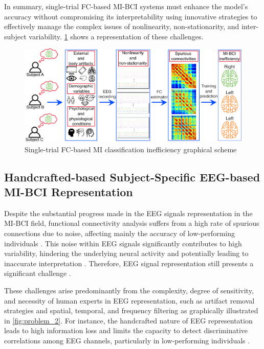In summary, single-trial FC-based MI-BCI systems must enhance the model's accuracy without compromising its interpretability using innovative strategies to effectively manage the complex issues of nonlinearity, non-stationarity, and inter-subject variability. \cref{fig:problem_1} shows a representation of these challenges.

\begin{figure}[!h]
    \centering
    \includegraphics[width=1.0\linewidth]{Figures/problem_statement/problem1_FV.pdf}
    \caption{Single-trial FC-based MI classification inefficiency graphical scheme}\label{fig:problem_1}
\end{figure}


\subsection{Handcrafted-based Subject-Specific EEG-based MI-BCI Representation \label{sec:problem2}}

Despite the substantial progress made in the EEG signals representation in the MI-BCI field, functional connectivity analysis suffers from a high rate of spurious connections due to noise, affecting mainly the accuracy of low-performing individuals \cite{ismail2020graph,wang2020diverse,congedo2017fixed}. This noise within EEG signals significantly contributes to high variability, hindering the underlying neural activity and potentially leading to inaccurate interpretation \cite{caicedo2021deep}. Therefore, EEG signal representation still presents a significant challenge \cite{rashid2020current}.

These challenges arise predominantly from the complexity, degree of sensitivity, and necessity of human experts in EEG representation, such as artifact removal strategies and spatial, temporal, and frequency filtering \cite{chamola2020brain, padfield2019eeg} as graphically illustrated in \cref{fig:problem_2}. For instance, the handcrafted nature of EEG representation leads to high information loss and limits the capacity to detect discriminative correlations among EEG channels, particularly in low-performing individuals \cite{altaheri2023deep}.

